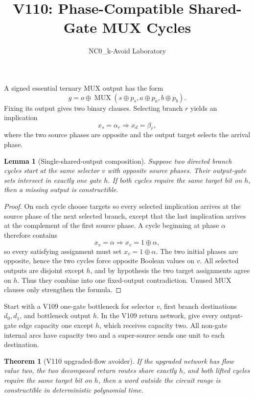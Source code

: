 \documentclass[11pt]{article}
\newtheorem{theorem}{Theorem}
\newtheorem{lemma}{Lemma}
\begin{document}
\title{V110: Phase-Compatible Shared-Gate MUX Cycles}
\author{NC0\_k-Avoid Laboratory}
\date{}
\maketitle

A signed essential ternary MUX output has the form
\[
 g=o\oplus \operatorname{MUX}(s\oplus p_s,a\oplus p_a,b\oplus p_b).
\]
Fixing its output gives two binary clauses. Selecting branch $r$ yields an
implication
\[
 x_s=\alpha_r\Longrightarrow x_d=\beta_r,
\]
where the two source phases are opposite and the output target selects the
arrival phase.

\begin{lemma}[Single-shared-output composition]
Suppose two directed branch cycles start at the same selector $v$ with opposite
source phases. Their output-gate sets intersect in exactly one gate $h$. If both
cycles require the same target bit on $h$, then a missing output is constructible.
\end{lemma}

\begin{proof}
On each cycle choose targets so every selected implication arrives at the source
phase of the next selected branch, except that the last implication arrives at
the complement of the first source phase. A cycle beginning at phase $\alpha$
therefore contains
\[
 x_v=\alpha\Longrightarrow x_v=1\oplus\alpha,
\]
so every satisfying assignment must set $x_v=1\oplus\alpha$. The two initial
phases are opposite, hence the two cycles force opposite Boolean values on $v$.
All selected outputs are disjoint except $h$, and by hypothesis the two target
assignments agree on $h$. Thus they combine into one fixed-output contradiction.
Unused MUX clauses only strengthen the formula.
\end{proof}

Start with a V109 one-gate bottleneck for selector $v$, first branch
destinations $d_0,d_1$, and bottleneck output $h$. In the V109 return network,
give every output-gate edge capacity one except $h$, which receives capacity two.
All non-gate internal arcs have capacity two and a super-source sends one unit to
each destination.

\begin{theorem}[V110 upgraded-flow avoider]
If the upgraded network has flow value two, the two decomposed return routes
share exactly $h$, and both lifted cycles require the same target bit on $h$,
then a word outside the circuit range is constructible in deterministic
polynomial time.
\end{theorem}
\end{document}
